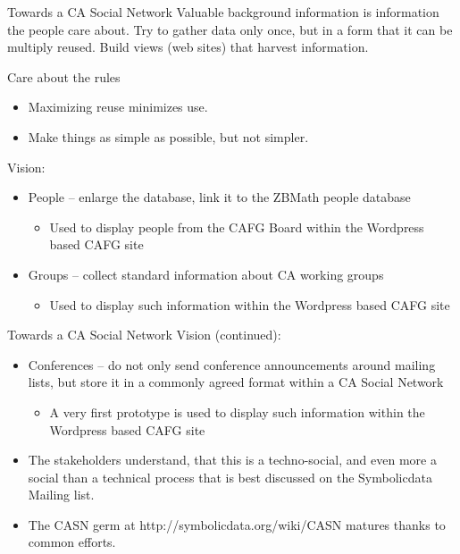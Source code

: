 \documentclass{beamer}
\begin{document}
\begin{frame}{Towards a CA Social Network}{}
Valuable background information is information the people care about. Try to
gather data only once, but in a form that it can be multiply reused. Build
views (web sites) that harvest information.

Care about the rules
\begin{itemize}
\item Maximizing reuse minimizes use.
\item Make things as simple as possible, but not simpler. 
\end{itemize}
Vision:
\begin{itemize}
\item People -- enlarge the database, link it to the ZBMath people database
\begin{itemize}
\item Used to display people from the CAFG Board within the Wordpress based
  CAFG site
\end{itemize}
\item Groups -- collect standard information about CA working groups 
\begin{itemize}
\item Used to display such information within the Wordpress based CAFG site
\end{itemize}
\end{itemize}
\end{frame}

\begin{frame}{Towards a CA Social Network}{}
Vision (continued):
\begin{itemize}
\item Conferences -- do not only send conference announcements around mailing
  lists, but store it in a commonly agreed format within a CA Social Network
\begin{itemize}
\item A very first prototype is used to display such information within the
  Wordpress based CAFG site
\end{itemize}
\item The stakeholders understand, that this is a techno-social, and even more
  a social than a technical process that is best discussed on the Symbolicdata
  Mailing list.
\item The CASN germ at http://symbolicdata.org/wiki/CASN matures thanks to
  common efforts.
\end{itemize}
\end{frame}
\end{document}
